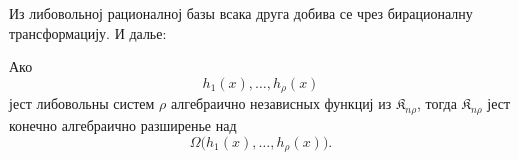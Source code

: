 ﻿\documentclass[11pt]{article}
\providecommand{\Kfield}{\mathfrak{K}}
\begin{document}
Из либовольној рационалној базы всака друга добива се чрез бирационалну трансформацију. И далье:

Ако
\[
  h_1(x),\ldots,h_\rho(x)
\]
јест либовольны систем $\rho$ алгебраично независных функциј из $\Kfield_{n\rho}$, тогда $\Kfield_{n\rho}$ јест конечно алгебраично разширенье над
\[
  \Omega\bigl(h_1(x),\ldots,h_\rho(x)\bigr).
\]
\end{document}
